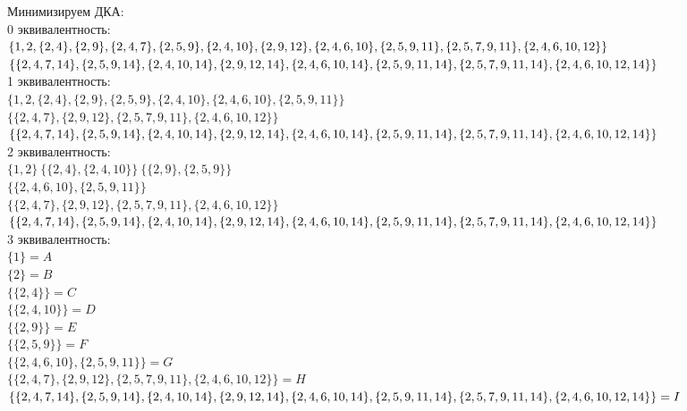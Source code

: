 \documentclass[12pt]{article}
\begin{document}
	Минимизируем ДКА: \\
	0 эквивалентность: \\ 
		$\{1,2,\{2,4\},\{2,9\},\{2,4,7\},\{2,5,9\},\{2,4,10\},\{2,9,12\},\{2,4,6,10\},\{2,5,9,11\},\{2,5,7,9,11\},\\\{2,4,6,10,12\}\}$ \\ 
		$\{\{2,4,7,14\},\{2,5,9,14\},\{2,4,10,14\},\{2,9,12,14\},\{2,4,6,10,14\},\{2,5,9,11,14\},\\\{2,5,7,9,11,14\},\{2,4,6,10,12,14\}\}$ \\
	 
	1 эквивалентность: \\
		$\{1,2,\{2,4\},\{2,9\},\{2,5,9\},\{2,4,10\},\{2,4,6,10\},\{2,5,9,11\}\}$ \\
		$\{\{2,4,7\},\{2,9,12\},\{2,5,7,9,11\},\{2,4,6,10,12\}\}$ \\
		$\{\{2,4,7,14\},\{2,5,9,14\},\{2,4,10,14\},\{2,9,12,14\},\{2,4,6,10,14\},\{2,5,9,11,14\},\\\{2,5,7,9,11,14\},\{2,4,6,10,12,14\}\}$ \\
	 
	2 эквивалентность: \\
		$\{1,2\}\ \{\{2,4\},\{2,4,10\}\}\ \{\{2,9\},\{2,5,9\}\}$ \\
		$\{\{2,4,6,10\},\{2,5,9,11\}\}$ \\
		$\{\{2,4,7\},\{2,9,12\},\{2,5,7,9,11\},\{2,4,6,10,12\}\}$ \\
		$\{\{2,4,7,14\},\{2,5,9,14\},\{2,4,10,14\},\{2,9,12,14\},\{2,4,6,10,14\},\{2,5,9,11,14\},\\\{2,5,7,9,11,14\},\{2,4,6,10,12,14\}\}$ \\

	3 эквивалентность: \\
		$\{1\} = A$ \\
	 	$\{2\} = B$ \\
	 	$\{\{2,4\}\} = C$ \\
	 	$\{\{2,4,10\}\} = D$ \\
	 	$\{\{2,9\}\} = E$ \\
		$\{\{2,5,9\}\} = F$ \\
		$\{\{2,4,6,10\},\{2,5,9,11\}\} = G$ \\
		$\{\{2,4,7\},\{2,9,12\},\{2,5,7,9,11\},\{2,4,6,10,12\}\} = H$ \\
	 	$\{\{2,4,7,14\},\{2,5,9,14\},\{2,4,10,14\},\{2,9,12,14\},\{2,4,6,10,14\},\{2,5,9,11,14\},\\\{2,5,7,9,11,14\},\{2,4,6,10,12,14\}\} = I$ \\
		
\end{document}
